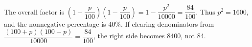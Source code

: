 The overall factor is $(1+\dfrac{p}{100})(1-\dfrac{p}{100})=1-\dfrac{p^2}{10000}=\dfrac{84}{100}$. Thus $p^2=1600$, and the nonnegative percentage is $\boxed{40\%}$. If clearing denominators from $\dfrac{(100+p)(100-p)}{10000}=\dfrac{84}{100}$, the right side becomes 8400, not 84.
